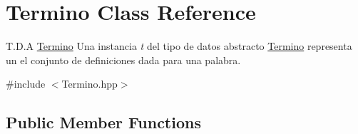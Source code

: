\hypertarget{class_termino}{}\section{Termino Class Reference}
\label{class_termino}


T.\+D.\+A \mbox{\hyperlink{class_termino}{Termino}} Una instancia {\itshape t} del tipo de datos abstracto {\ttfamily \mbox{\hyperlink{class_termino}{Termino}}} representa un el conjunto de definiciones dada para una palabra.  




{\ttfamily \#include $<$Termino.\+hpp$>$}

\subsection*{Public Member Functions}
